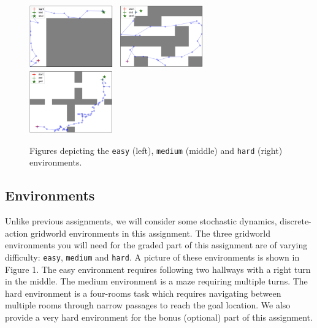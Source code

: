 \documentclass{article}
\begin{document}
\begin{figure}[h]
    \centering
    \includegraphics[width=0.32\textwidth]{easy.png}~
    \includegraphics[width=0.32\textwidth]{medium.png}~
    \includegraphics[width=0.32\textwidth]{hard.png}
    \vspace{-10pt}
    \caption{Figures depicting the \texttt{easy} (left), \texttt{medium} (middle) and \texttt{hard} (right) environments.}
    \vspace{-10pt}
\end{figure}
\subsection{Environments}
Unlike previous assignments, we will consider some stochastic dynamics, discrete-action gridworld environments in this assignment. The three gridworld environments you will need for the graded part of this assignment are of varying difficulty: \texttt{easy}, \texttt{medium} and \texttt{hard}. A picture of these environments is shown in Figure 1. The easy environment requires following two hallways with a right turn in the middle. The medium environment is a maze requiring multiple turns. The hard environment is a four-rooms task which requires navigating between multiple rooms through narrow passages to reach the goal location. We also provide a very hard environment for the bonus (optional) part of this assignment.
\end{document}
